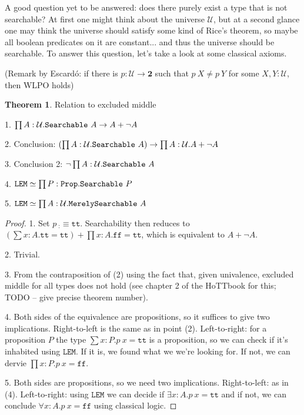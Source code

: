 \documentclass[11pt]{article}
\theoremstyle{definition}
\newtheorem{theorem}{Theorem}[section]
\newcommand{\txt}[1]{\texttt{#1}}
\newcommand{\text}[1]{\texttt{#1}}
\renewcommand{\(}{\left(}
\renewcommand{\)}{\right)}
\newcommand{\defn}{:\equiv}
\newcommand{\U}{\mathcal{U}}
\newcommand{\Prop}{\text{Prop}}
\newcommand{\apl}[2]{#1\ #2}
\newcommand{\hequiv}[2]{#1 \simeq #2}
\newcommand{\Bool}{\mathbf{2}}
\newcommand{\true}{\txt{tt}}
\newcommand{\false}{\txt{ff}}
\newcommand{\dprod}[2]{\prod #1.#2}
\newcommand{\dsum}[2]{\sum #1.#2}
\newcommand{\all}[2]{\forall #1.#2}
\newcommand{\ex}[2]{\exists #1.#2}
\begin{document}
A good question yet to be answered: does there purely exist a type that is not searchable? At first one might think about the universe $\U$, but at a second glance one may think the universe should satisfy some kind of Rice's theorem, so maybe all boolean predicates on it are constant... and thus the universe should be searchable. To answer this question, let's take a look at some classical axioms.

(Remark by Escard\'{o}: if there is $p : \U \to \Bool$ such that $\apl{p}{X} \neq \apl{p}{Y}$ for some $X, Y : \U$, then WLPO holds)

\newcommand{\LEM}{\txt{LEM}}
\begin{theorem} Relation to excluded middle

1. $\dprod{A : \U}{\apl{\Searchable}{A} \to A + \neg A}$

2. Conclusion: $\(\dprod{A : \U}{\apl{\Searchable}{A}}\) \to \dprod{A : \U}{A + \neg A}$

3. Conclusion 2: $\neg \dprod{A : \U}{\apl{\Searchable}{A}}$

4. $\hequiv{\LEM}{\dprod{P : \Prop}{\apl{\Searchable}{P}}}$

5. $\hequiv{\LEM}{\dprod{A : \U}{\apl{\MerelySearchable}{A}}}$
\end{theorem}
\begin{proof}

1. Set $\apl{p}{_} \defn \true$. Searchability then reduces to $\(\dsum{x : A}{\true = \true}\) + \dprod{x : A}{\false = \true}$, which is equivalent to $A + \neg A$.

2. Trivial.

3. From the contraposition of (2) using the fact that, given univalence, excluded middle for all types does not hold (see chapter 2 of the HoTTbook for this; TODO -- give precise theorem number).

4. Both sides of the equivalence are propositions, so it suffices to give two implications. Right-to-left is the same as in point (2). Left-to-right: for a proposition $P$ the type $\dsum{x : P}{\apl{p}{x} = \true}$ is a proposition, so we can check if it's inhabited using $\LEM$. If it is, we found what we we're looking for. If not, we can dervie $\dprod{x : P}{\apl{p}{x} = \false}$.

5. Both sides are propositions, so we need two implications. Right-to-left: as in (4). Left-to-right: using $\LEM$ we can decide if $\ex{x : A}{\apl{p}{x} = \true}$ and if not, we can conclude $\all{x : A}{\apl{p}{x} = \false}$ using classical logic.
\end{proof}
\end{document}

